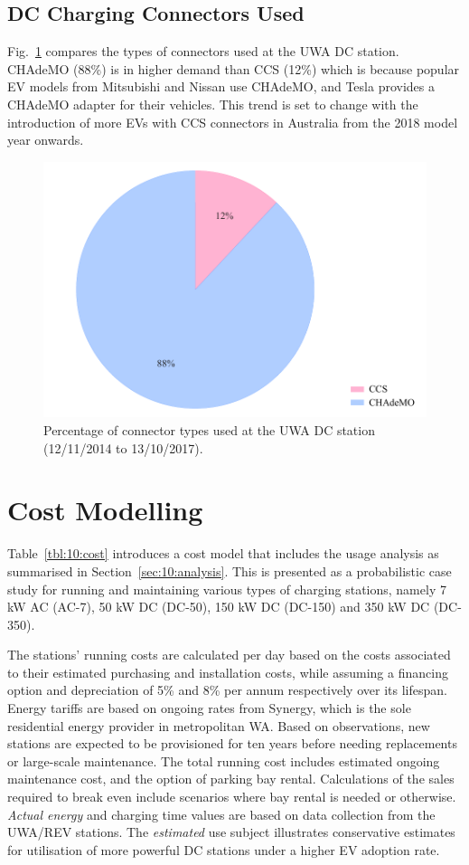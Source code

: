 \subsection{DC Charging Connectors Used}
Fig.~\ref{fig:10:uwaplug} compares the types of connectors used at the UWA DC station. CHAdeMO (88\%) is in higher demand than CCS (12\%) which is because popular EV models from Mitsubishi and Nissan use CHAdeMO, and Tesla provides a CHAdeMO adapter for their vehicles. This trend is set to change with the introduction of more EVs with CCS connectors in Australia from the 2018 model year onwards. 

\begin{figure}[H]
	\centering
	\includegraphics[width=0.7\linewidth]{uwaplug}
	\caption[Percentage of connector types used at the UWA DC station]{Percentage of connector types used at the UWA DC station (12/11/2014 to 13/10/2017).}
	\label{fig:10:uwaplug}
\end{figure}

\section{Cost Modelling}
\label{sec:10:cost}
Table~\ref{tbl:10:cost} introduces a cost model that includes the usage analysis as summarised in Section~\ref{sec:10:analysis}. This is presented as a probabilistic case study for running and maintaining various types of charging stations, namely 7 kW AC (AC-7), 50 kW DC (DC-50), 150 kW DC (DC-150) and 350 kW DC (DC-350).

The stations’ running costs are calculated per day based on the costs associated to their estimated purchasing and installation costs, while assuming a financing option and depreciation of 5\% and 8\% per annum respectively over its lifespan. Energy tariffs are based on ongoing rates from Synergy, which is the sole residential energy provider in metropolitan WA. Based on observations, new stations are expected to be provisioned for ten years before needing replacements or large-scale maintenance. The total running cost includes estimated ongoing maintenance cost, and the option of parking bay rental. Calculations of the sales required to break even include scenarios where bay rental is needed or otherwise. \textit{Actual energy} and charging time values are based on data collection from the UWA/REV stations. The \textit{estimated} use subject illustrates conservative estimates for utilisation of more powerful DC stations under a higher EV adoption rate. 

